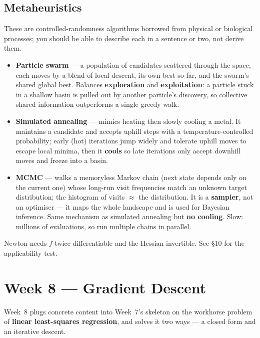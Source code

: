 \documentclass[11pt, a4paper]{article}
\newcommand{\kw}[1]{\textbf{#1}}
\begin{document}
\subsection{Metaheuristics}

These are controlled-randomness algorithms borrowed from physical or biological processes; you should
be able to describe each in a sentence or two, not derive them.

\begin{itemize}
  \item \kw{Particle swarm} — a population of candidates scattered through the space; each moves by a
  blend of local descent, its own best-so-far, and the swarm's shared global best. Balances
  \kw{exploration} and \kw{exploitation}: a particle stuck in a shallow basin is pulled out by
  another particle's discovery, so collective shared information outperforms a single greedy walk.
  \item \kw{Simulated annealing} — mimics heating then slowly cooling a metal. It maintains a
  candidate and accepts uphill steps with a temperature-controlled probability; early (hot) iterations
  jump widely and tolerate uphill moves to escape local minima, then it \kw{cools} so late iterations
  only accept downhill moves and freeze into a basin.
  \item \kw{MCMC} — walks a memoryless Markov chain (next state depends only on the current one)
  whose long-run visit frequencies match an unknown target distribution; the histogram of visits
  $\approx$ the distribution. It is a \kw{sampler}, not an optimiser — it maps the whole landscape and
  is used for Bayesian inference. Same mechanism as simulated annealing but \kw{no cooling}. Slow:
  millions of evaluations, so run multiple chains in parallel.
\end{itemize}

\begin{trapbox}
Newton needs $f$ twice-differentiable and the Hessian invertible. See §10 for the applicability test.
\end{trapbox}

\section{Week 8 — Gradient Descent}

Week~8 plugs concrete content into Week~7's skeleton on the workhorse problem of \kw{linear
least-squares regression}, and solves it two ways — a closed form and an iterative descent.
\end{document}
